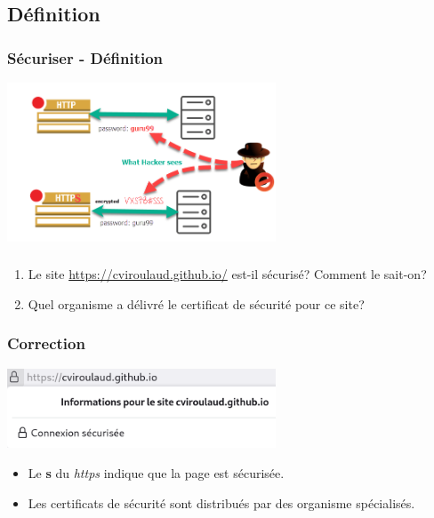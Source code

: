 \documentclass[svgnames,11pt]{beamer}
\begin{document}
\subsection{Définition}
\begin{frame}
    \frametitle{Sécuriser - Définition}

    \begin{center}
        \centering
        \includegraphics[width=8cm]{ressources/secure.png}
        \label{IMG}
    \end{center}
\end{frame}
\begin{frame}
    \frametitle{}

    \begin{activite}
        \begin{enumerate}
            \item Le site \url{https://cviroulaud.github.io/} est-il sécurisé? Comment le sait-on?
            \item Quel organisme a délivré le certificat de sécurité pour ce site?
        \end{enumerate}
    \end{activite}

\end{frame}
\begin{frame}
    \frametitle{Correction}

    \begin{center}
        \centering
        \includegraphics[width=8cm]{ressources/certificat.png}
    \end{center}
    \begin{aretenir}[]
        \begin{itemize}
            \item Le \textbf{s} du \emph{https} indique que la page est sécurisée.
            \item Les certificats de sécurité sont distribués par des organisme spécialisés.
        \end{itemize}
    \end{aretenir}
\end{frame}
\end{document}
